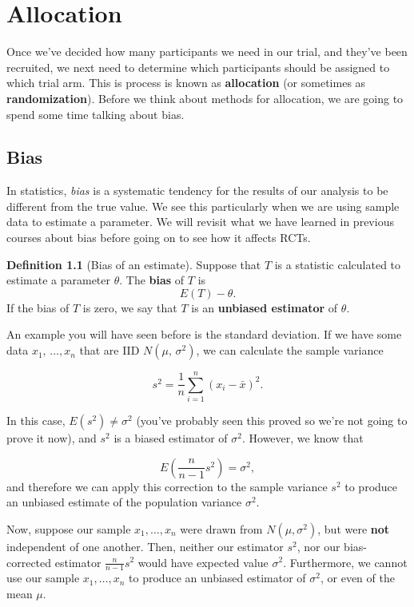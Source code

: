 \documentclass[
  openany]{book}
\theoremstyle{definition}
\newtheorem{definition}{Definition}[chapter]
\theoremstyle{definition}
\theoremstyle{definition}
\theoremstyle{definition}
\theoremstyle{remark}
\begin{document}
\hypertarget{allocation}{%
\chapter{Allocation}\label{allocation}}

Once we've decided how many participants we need in our trial, and they've been recruited, we next need to determine which participants should be assigned to which trial arm. This is process is known as \textbf{allocation} (or sometimes as \textbf{randomization}). Before we think about methods for allocation, we are going to spend some time talking about bias.

\hypertarget{bias}{%
\section{Bias}\label{bias}}

In statistics, \emph{bias} is a systematic tendency for the results of our analysis to be different from the true value. We see this particularly when we are using sample data to estimate a parameter. We will revisit what we have learned in previous courses about bias before going on to see how it affects RCTs.

\begin{definition}[Bias of an estimate]
Suppose that \(T\) is a statistic calculated to estimate a parameter \(\theta\). The \textbf{bias} of \(T\) is \[E\left(T\right) - \theta.\] If the bias of \(T\) is zero, we say that \(T\) is an \textbf{unbiased estimator} of \(\theta\).
\end{definition}

An example you will have seen before is the standard deviation. If we have some data \(x_1,\,\ldots,x_n\) that are IID \(N\left(\mu,\,\sigma^2\right)\), we can calculate the sample variance

\[ s^2 = \frac{1}{n}\sum\limits_{i=1}^n\left(x_i - \bar{x}\right)^2 .\]

In this case, \(E\left(s^2\right) \neq {\sigma^2}\) (you've probably seen this proved so we're not going to prove it now), and \(s^2\) is a biased estimator of \(\sigma^2\). However, we know that

\[E \left(\frac{n}{n-1}s^2\right) = \sigma^2,\]
and therefore we can apply this correction to the sample variance \(s^2\) to produce an unbiased estimate of the population variance \(\sigma^2\).

Now, suppose our sample \(x_1,\ldots,x_n\) were drawn from \(N\left(\mu,\sigma^2\right)\), but were \textbf{not} independent of one another. Then, neither our estimator \(s^2\), nor our bias-corrected estimator \(\frac{n}{n-1}s^2\) would have expected value \(\sigma^2\). Furthermore, we cannot use our sample \(x_1,\ldots,x_n\) to produce an unbiased estimator of \(\sigma^2\), or even of the mean \(\mu\).
\end{document}
